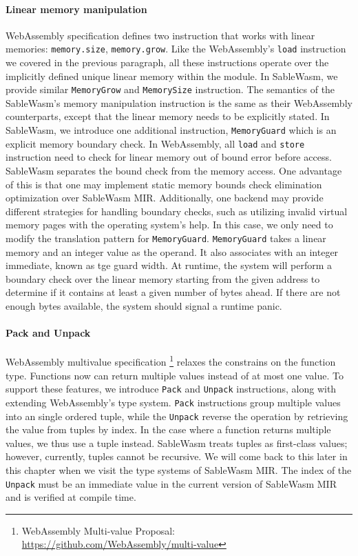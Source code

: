 \paragraph{Linear memory manipulation}
WebAssembly specification defines two instruction that works with linear
memories: \texttt{memory.size}, \texttt{memory.grow}. Like the WebAssembly's
\texttt{load} instruction we covered in the previous paragraph, all these
instructions operate over the implicitly defined unique linear memory within the
module. In SableWasm, we provide similar \texttt{MemoryGrow} and
\texttt{MemorySize} instruction. The semantics of the SableWasm's memory
manipulation instruction is the same as their WebAssembly counterparts, except
that the linear memory needs to be explicitly stated. In SableWasm, we introduce
one additional instruction, \texttt{MemoryGuard} which is an explicit memory
boundary check. In WebAssembly, all \texttt{load} and \texttt{store} instruction
need to check for linear memory out of bound error before access. SableWasm
separates the bound check from the memory access. One advantage of this is that
one may implement static memory bounds check elimination optimization over
SableWasm MIR. Additionally, one backend may provide different strategies for
handling boundary checks, such as utilizing invalid virtual memory pages with
the operating system's help. In this case, we only need to modify the
translation pattern for \texttt{MemoryGuard}. \texttt{MemoryGuard} takes a
linear memory and an integer value as the operand. It also associates with an
integer immediate, known as tge guard width. At runtime, the system will perform
a boundary check over the linear memory starting from the given address to
determine if it contains at least a given number of bytes ahead. If there are
not enough bytes available, the system should signal a runtime panic.

\paragraph{Pack and Unpack}
WebAssembly multivalue specification \footnote{WebAssembly Multi-value Proposal:
  \url{https://github.com/WebAssembly/multi-value}} relaxes the constrains on
the function type. Functions now can return multiple values instead of at most
one value. To support these features, we introduce \texttt{Pack} and
\texttt{Unpack} instructions, along with extending WebAssembly's type system.
\texttt{Pack} instructions group multiple values into an single ordered tuple,
while the \texttt{Unpack} reverse the operation by retrieving the value from
tuples by index. In the case where a function returns multiple values, we thus
use a tuple instead. SableWasm treats tuples as first-class values; however,
currently, tuples cannot be recursive. We will come back to this later in this
chapter when we visit the type systems of SableWasm MIR. The index of the
\texttt{Unpack} must be an immediate value in the current version of SableWasm
MIR and is verified at compile time.

